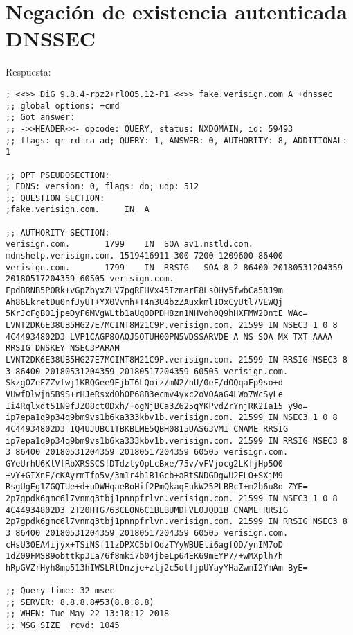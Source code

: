 \documentclass[11pt]{article}
\begin{document}
\section{Negación de existencia autenticada DNSSEC}

Respuesta:

\begin{lstlisting}
; <<>> DiG 9.8.4-rpz2+rl005.12-P1 <<>> fake.verisign.com A +dnssec
;; global options: +cmd
;; Got answer:
;; ->>HEADER<<- opcode: QUERY, status: NXDOMAIN, id: 59493
;; flags: qr rd ra ad; QUERY: 1, ANSWER: 0, AUTHORITY: 8, ADDITIONAL: 1

;; OPT PSEUDOSECTION:
; EDNS: version: 0, flags: do; udp: 512
;; QUESTION SECTION:
;fake.verisign.com.		IN	A

;; AUTHORITY SECTION:
verisign.com.		1799	IN	SOA	av1.nstld.com. mdnshelp.verisign.com. 1519416911 300 7200 1209600 86400
verisign.com.		1799	IN	RRSIG	SOA 8 2 86400 20180531204359 20180517204359 60505 verisign.com. FpdBRNB5PORk+vGpZbyxZLV7pgREHVx45IzmarE8LsOHy5fwbCa5RJ9m Ah86EkretDu0nfJyUT+YX0Vvmh+T4n3U4bzZAuxkmlIOxCyUtl7VEWQj 5KrJcFgBO1jpeDyF6MVgWLtb1aUqODPDH8zn1NHVoh0Q9hHXFMW2OntE WAc=
LVNT2DK6E38UB5HG27E7MCINT8M21C9P.verisign.com. 21599 IN	NSEC3 1 0 8 4C44934802D3 LVP1CAGP8QAQJ5OTUH00PN5VDSSARVDE A NS SOA MX TXT AAAA RRSIG DNSKEY NSEC3PARAM
LVNT2DK6E38UB5HG27E7MCINT8M21C9P.verisign.com. 21599 IN	RRSIG NSEC3 8 3 86400 20180531204359 20180517204359 60505 verisign.com. SkzgOZeFZZvfwj1KRQGee9EjbT6LQoiz/mN2/hU/0eF/dOQqaFp9so+d VUwfDlwjnSB9S+rHJeRsxdOhOP68B3ecmv4yxc2oVOAaG4LWo7WcSyLe Ii4Rqlxdt51N9fJZO8ct0Dxh/+ogNjBCa3Z625qYKPvdZrYnjRK2Ia15 y9o=
ip7epa1q9p34q9bm9vs1b6ka333kbv1b.verisign.com. 21599 IN	NSEC3 1 0 8 4C44934802D3 IQ4UJUBC1TBKBLME5QBH0815UAS63VMI CNAME RRSIG
ip7epa1q9p34q9bm9vs1b6ka333kbv1b.verisign.com. 21599 IN	RRSIG NSEC3 8 3 86400 20180531204359 20180517204359 60505 verisign.com. GYeUrhU6KlVfRbXRSSCSfDTdztyOpLcBxe/75v/vFVjocg2LKfjHp5O0 +vY+GIXnE/cKAyrmTfo5v/3m1r4b1B1Gcb+aRtSNDGDgwU2ELO+SXjM9 RsgUgEg1ZGQTUe+d+uDWHqaeBoHif2PmQkaqFukW25PLBBcI+m2b6u8o ZYE=
2p7gpdk6gmc6l7vnmq3tbj1pnnpfrlvn.verisign.com. 21599 IN	NSEC3 1 0 8 4C44934802D3 2T20HTG763CE0N6C1BLBUMDFVL0JQD1B CNAME RRSIG
2p7gpdk6gmc6l7vnmq3tbj1pnnpfrlvn.verisign.com. 21599 IN	RRSIG NSEC3 8 3 86400 20180531204359 20180517204359 60505 verisign.com. cHsU30EA4ijyx+TSiNSf11zDPXC5bfOdzTYyWBUEli6agfOD/ynIM7oD 1dZ09FMSB9obttkp3La76f8mki7b04jbeLp64EK69mEYP7/+wMXplh7h hRpGVZrHyh8mp513hIWSLRtDnzje+zlj2c5olfjpUYayYHaZwmI2YmAm ByE=

;; Query time: 32 msec
;; SERVER: 8.8.8.8#53(8.8.8.8)
;; WHEN: Tue May 22 13:18:12 2018
;; MSG SIZE  rcvd: 1045
\end{lstlisting}
\end{document}
